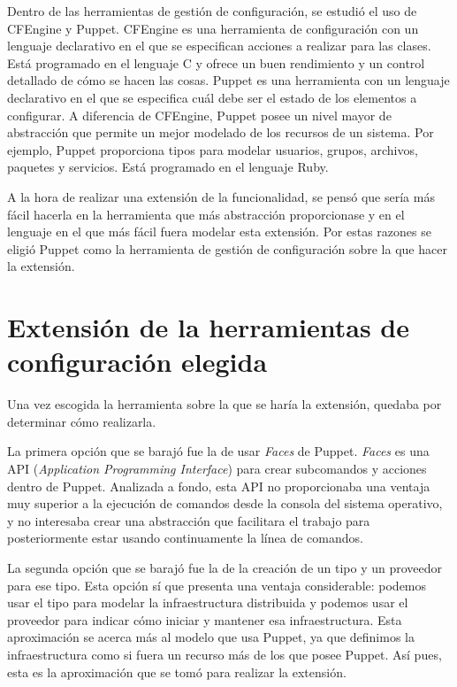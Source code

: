 Dentro de las herramientas de gestión de configuración, se estudió el uso de CFEngine y Puppet. CFEngine es una herramienta de configuración con un lenguaje declarativo en el que se especifican acciones a realizar para las clases. Está programado en el lenguaje C y ofrece un buen rendimiento y un control detallado de cómo se hacen las cosas. Puppet es una herramienta con un lenguaje declarativo en el que se especifica cuál debe ser el estado de los elementos a configurar. A diferencia de CFEngine, Puppet posee un nivel mayor de abstracción que permite un mejor modelado de los recursos de un sistema. Por ejemplo, Puppet proporciona tipos para modelar usuarios, grupos, archivos, paquetes y servicios. Está programado en el lenguaje Ruby.

A la hora de realizar una extensión de la funcionalidad, se pensó que sería más fácil hacerla en la herramienta que más abstracción proporcionase y en el lenguaje en el que más fácil fuera modelar esta extensión. Por estas razones se eligió Puppet como la herramienta de gestión de configuración sobre la que hacer la extensión.


\section{Extensión de la herramientas de configuración elegida}

Una vez escogida la herramienta sobre la que se haría la extensión, quedaba por determinar cómo realizarla.

La primera opción que se barajó fue la de usar \emph{Faces} de Puppet. \emph{Faces} es una API (\emph{Application Programming Interface}) para crear subcomandos y acciones dentro de Puppet. Analizada a fondo, esta API no proporcionaba una ventaja muy superior a la ejecución de comandos desde la consola del sistema operativo, y no interesaba crear una abstracción que facilitara el trabajo para posteriormente estar usando continuamente la línea de comandos.

La segunda opción que se barajó fue la de la creación de un tipo y un proveedor para ese tipo. Esta opción sí que presenta una ventaja considerable: podemos usar el tipo para modelar la infraestructura distribuida y podemos usar el proveedor para indicar cómo iniciar y mantener esa infraestructura. Esta aproximación se acerca más al modelo que usa Puppet, ya que definimos la infraestructura como si fuera un recurso más de los que posee Puppet. Así pues, esta es la aproximación que se tomó para realizar la extensión.
